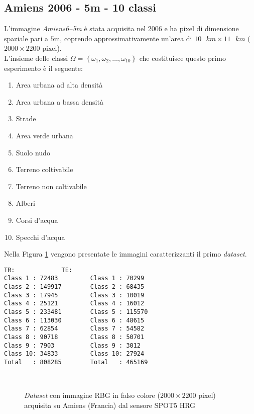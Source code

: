 \subsection{Amiens 2006 - 5m - 10 classi}
L'immagine \emph{Amiens6--5m} è stata acquisita nel 2006 e ha pixel di dimensione spaziale pari a $5\text{m}$, coprendo approssimativamente un'area di $10\text{ }km\times11\text{ }km$ ($2000\times2200$ pixel).\\
L'insieme delle classi $\Omega=\left\lbrace\omega_1,\omega_2,\ldots,\omega_{10}\right\rbrace$ che costituisce questo primo esperimento è il seguente:
\begin{enumerate}
\item Area urbana ad alta densità
\item Area urbana a bassa densità
\item Strade
\item Area verde urbana 
\item Suolo nudo
\item Terreno coltivabile
\item Terreno non coltivabile 
\item Alberi
\item Corsi d'acqua
\item Specchi d'acqua
\end{enumerate}
Nella Figura \ref{fig: Amiens65m} vengono presentate le immagini caratterizzanti il primo \emph{dataset}. 
\begin{lstlisting}[float=b,title={Distribuzione dei pixel di training (TR) e test (TS) classe per classe.},
                   label=lst:esempio, frame=lines]
TR:				TE:
Class 1 : 72483 		Class 1 : 70299
Class 2 : 149917 		Class 2 : 68435
Class 3 : 17945 		Class 3 : 10019
Class 4 : 25121 		Class 4 : 16012
Class 5 : 233481 		Class 5 : 115570
Class 6 : 113030 		Class 6 : 48615
Class 7 : 62854 		Class 7 : 54582
Class 8 : 90718 		Class 8 : 50701
Class 9 : 7903 			Class 9 : 3012
Class 10: 34833 		Class 10: 27924
Total   : 808285		Total   : 465169
\end{lstlisting}
\clearpage
\begin{figure}[!ht]
   \center
   \\%
     \hspace{4mm}
    \caption{\emph{Dataset} con immagine RBG in falso colore ($2000\times2200$ pixel) acquisita su Amiens (Francia) dal sensore \textsc{SPOT5 HRG}}
    \label{fig: Amiens65m}
  \end{figure}
  
